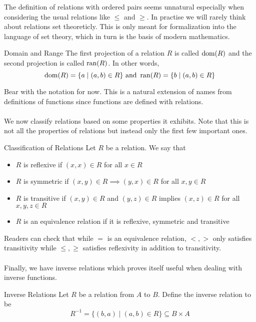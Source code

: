 \documentclass[a4paper]{article}
\begin{document}
The definition of relations with ordered pairs seems unnatural especially when considering the usual relations like $\leq$ and $\geq$. In practise we will rarely think about relations set theoreticly. This is only meant for formalization into the language of set theory, which in turn is the basis of modern mathematics. 

\begin{defn}{Domain and Range}{} The first projection of a relation $R$ is called $\operatorname{dom}(R)$ and the second projection is called $\operatorname{ran}(R)$. In other words, $$\operatorname{dom}(R)=\{a\;|\;(a,b)\in R\}\text{  and  }\operatorname{ran}(R)=\{b\;|\;(a,b)\in R\}$$
\end{defn}

Bear with the notation for now. This is a natural extension of names from definitions of functions since functions are defined with relations. \\~\\

We now classify relations based on some properties it exhibits. Note that this is not all the properties of relations but instead only the first few important ones. 

\begin{defn}{Classification of Relations}{} Let $R$ be a relation. We say that 
\begin{itemize}
\item $R$ is reflexive if $(x,x)\in R$ for all $x\in R$
\item $R$ is symmetric if $(x,y)\in R\implies (y,x)\in R$ for all $x,y\in R$
\item $R$ is transitive if $(x,y)\in R$ and $(y,z)\in R$ implies $(x,z)\in R$ for all $x,y,z\in R$
\item $R$ is an equivalence relation if it is reflexive, symmetric and transitive
\end{itemize}
\end{defn}

Readers can check that while $=$ is an equivalence relation, $<,>$ only satisfies transitivity while $\leq,\geq$ satisfies reflexivity in addition to transitivity. \\~\\

Finally, we have inverse relations which proves itself useful when dealing with inverse functions. 

\begin{defn}{Inverse Relations}{} Let $R$ be a relation from $A$ to $B$. Define the inverse relation to be $$R^{-1}=\{(b,a)\;|\;(a,b)\in R\}\subseteq B\times A$$
\end{defn}
\end{document}
